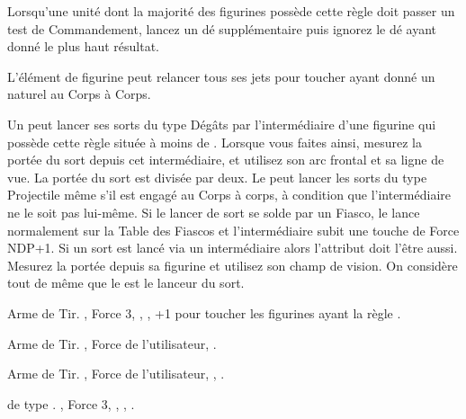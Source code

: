 









\startarmyspecialrules

\armyspecialruleentry{\coldblooded}

Lorsqu'une unité dont la majorité des figurines possède cette règle doit passer un test de Commandement, lancez un dé supplémentaire puis ignorez le dé ayant donné le plus haut résultat.

\armyspecialruleentry{\bornpredator}

L'élément de figurine peut relancer tous ses jets pour toucher ayant donné un  naturel au Corps à Corps.

\armyspecialruleentry{\telepathiclink}

Un \cuatllord{} peut lancer ses sorts du type Dégâts par l'intermédiaire d'une figurine qui possède cette règle située à moins de . Lorsque vous faites ainsi, mesurez la portée du sort depuis cet intermédiaire, et utilisez son arc frontal et sa ligne de vue. La portée du sort est divisée par deux. Le \cuatllord{} peut lancer les sorts du type Projectile même s'il est engagé au Corps à corps, à condition que l'intermédiaire ne le soit pas lui-même. Si le lancer de sort se solde par un Fiasco, le \cuatllord{} lance normalement sur la Table des Fiascos et l'intermédiaire subit une touche de Force NDP+1. Si un sort est lancé via un intermédiaire alors l'attribut doit l'être aussi. Mesurez la portée depuis sa figurine et utilisez son champ de vision. On considère tout de même que le \cuatllord{} est le lanceur du sort.

\closearmyspecialrules






\vspace{1.5cm}
\startarmyarmoury

\startitemlistonecol

\listitemonecol{\blowpipe} Arme de Tir. , Force 3, \poisonedattacks{}, , +1 pour toucher les figurines ayant la règle \largetarget{}.

\listitemonecol{\javelin} Arme de Tir. , Force de l'utilisateur, \quicktofire{}.

\listitemonecol{\poisonedjavelin} Arme de Tir. , Force de l'utilisateur, \poisonedattacks{}, \quicktofire{}.

\listitemonecol{\giantblowpipe} \textbf{\artilleryweapon} de type \textbf{\volleygun}.\newline
{}, Force 3, \poisonedattacks{}, , \quicktofire{}.

